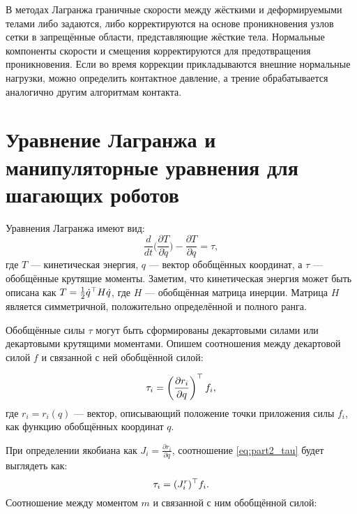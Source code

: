 В методах Лагранжа граничные скорости между жёсткими и деформируемыми телами либо задаются, либо корректируются на основе проникновения узлов сетки в запрещённые области, представляющие жёсткие тела. Нормальные компоненты скорости и смещения корректируются для предотвращения проникновения. Если во время коррекции прикладываются внешние нормальные нагрузки, можно определить контактное давление, а трение обрабатывается аналогично другим алгоритмам контакта.

\section{Уравнение Лагранжа и манипуляторные уравнения для шагающих роботов}\label{sec:ch2/sect3}

Уравнения Лагранжа имеют вид:
%
\begin{equation}
	\frac{d}{dt} \bigg( 
	\frac{\partial T }{\partial \dot{{q}}}
	\bigg) - 
	\frac{\partial T }{\partial {q}} = \tau,
\end{equation}
%
где $T$ --- кинетическая энергия, ${q}$ --- вектор обобщённых координат, а $\tau$ --- обобщённые крутящие моменты. Заметим, что кинетическая энергия может быть описана как $T = \frac{1}{2} \dot{{q}}^\top {H} \dot{{q}}$, где ${H}$ --- обобщённая матрица инерции. Матрица ${H}$ является симметричной, положительно определённой и полного ранга.

Обобщённые силы $\tau$ могут быть сформированы декартовыми силами или декартовыми крутящими моментами. Опишем соотношения между декартовой силой ${f}$ и связанной с ней обобщённой силой:

\begin{equation}
	\label{eq:part2_tau}
	\tau_i = \left( \frac{\partial {r}_i}{\partial {q}} \right)^\top {f}_i,
\end{equation}
%
где ${r}_i = {r}_i({q})$ --- вектор, описывающий положение точки приложения силы ${f}_i$, как функцию обобщённых координат ${q}$.

При определении якобиана как ${J}_i = \frac{\partial {r}_i}{\partial {q}}$, соотношение \eqref{eq:part2_tau} будет выглядеть как:
%
\begin{equation}
	\tau_i = ({J}^r_i)^\top {f}_i.
\end{equation}
%
Соотношение между моментом ${m}$ и связанной с ним обобщённой силой:

